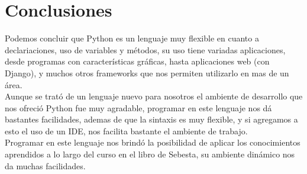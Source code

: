 \documentclass[11pt]{article} %
\begin{document}
\newpage
\thispagestyle{empty}

\section{\textbf{Conclusiones}}

Podemos concluir que Python es un lenguaje muy flexible en cuanto a declariaciones, uso de variables y m\'etodos, su uso tiene variadas aplicaciones, desde programas con caracter\'isticas gr\'aficas, hasta aplicaciones web (con Django), y muchos otros frameworks que nos permiten utilizarlo en mas de un \'area.
\\Aunque se trat\'o de un lenguaje nuevo para nosotros el ambiente de desarrollo que nos ofreci\'o  Python fue muy agradable, programar en este lenguaje nos d\'a bastantes facilidades, ademas de que la sintaxis es muy flexible, y si agregamos a esto el uso de un IDE, nos facilita bastante el ambiente de trabajo.
\\Programar en este lenguaje nos brind\'o la posibilidad de aplicar los conocimientos aprendidos a lo largo del curso en el libro de Sebesta, su ambiente din\'amico nos da muchas facilidades.
\end{document}
